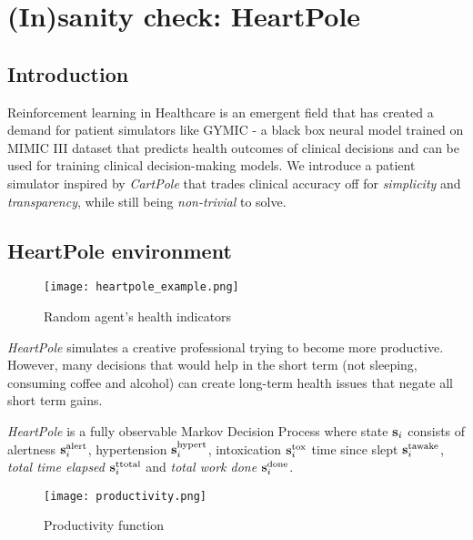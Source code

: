 \chapter{(In)sanity check: HeartPole}
\label{ch:heartpole}



\section{Introduction}
\label{sec:heartpole-introduction}

Reinforcement learning in Healthcare is an emergent field that has created a demand for patient simulators like GYMIC \cite{gym-sepsis} - a black box neural model trained on MIMIC III dataset \cite{johnsonMIMICIIIFreelyAccessible2016} that predicts health outcomes of clinical decisions and can be used for training clinical decision-making models. We introduce a patient simulator inspired by \emph{CartPole} \cite{cartpole} that trades clinical accuracy off for \emph{simplicity} and \emph{transparency}, while still being \emph{non-trivial} to solve.

\section{HeartPole environment}
\label{sec:heartpole-methodology}

\begin{figure}
    \centering
    \texttt{[image: heartpole\_example.png]}
    \caption{Random agent's health indicators}
    \label{fig:random}
\end{figure}

\emph{HeartPole} simulates a creative professional trying to become more productive.
However, many decisions that would help in the short term (not sleeping, consuming coffee and alcohol) can create long-term health issues that negate all short term gains.

\emph{HeartPole} is a fully observable Markov Decision Process \cite{mdp} where state $\textbf{s}_i$ consists of alertness $\textbf{s}^\text{alert}_i$, hypertension $\textbf{s}^\text{hypert}_i$, intoxication $\textbf{s}^\text{tox}_i$ time since slept $\textbf{s}^\text{tawake}_i$, \emph{total time elapsed} $\textbf{s}^\text{ttotal}_i$ and \emph{total work done} $\textbf{s}^\text{done}_i$.

\begin{figure}
    \centering
    \texttt{[image: productivity.png]}
    \caption{Productivity function}
    \label{fig:productivity}
\end{figure}

